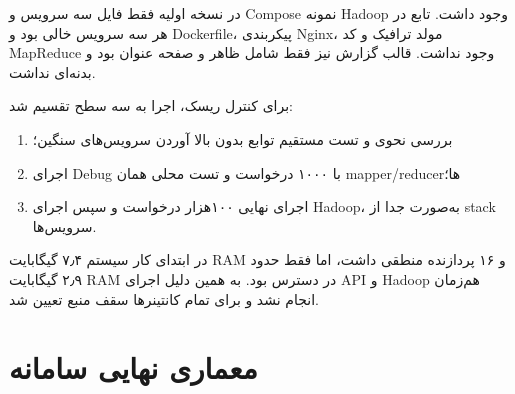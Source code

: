 \documentclass[12pt,a4paper]{article}
\begin{document}
در نسخه اولیه فقط فایل  سه سرویس و Compose نمونه Hadoop وجود داشت. تابع  در هر سه سرویس خالی بود و Dockerfile، پیکربندی Nginx، مولد ترافیک و کد MapReduce وجود نداشت. قالب گزارش نیز فقط شامل ظاهر و صفحه عنوان بود و بدنه‌ای نداشت.

برای کنترل ریسک، اجرا به سه سطح تقسیم شد:

\begin{enumerate}
  \item بررسی نحوی و تست مستقیم توابع بدون بالا آوردن سرویس‌های سنگین؛
  \item اجرای Debug با ۱۰۰۰ درخواست و تست محلی همان mapper/reducerها؛
  \item اجرای نهایی ۱۰۰هزار درخواست و سپس اجرای Hadoop، به‌صورت جدا از stack سرویس‌ها.
\end{enumerate}

در ابتدای کار سیستم ۷٫۴ گیگابایت RAM و ۱۶ پردازنده منطقی داشت، اما فقط حدود ۲٫۹ گیگابایت RAM در دسترس بود. به همین دلیل اجرای API و Hadoop هم‌زمان انجام نشد و برای تمام کانتینرها سقف منبع تعیین شد.

\section{معماری نهایی سامانه}
\end{document}
